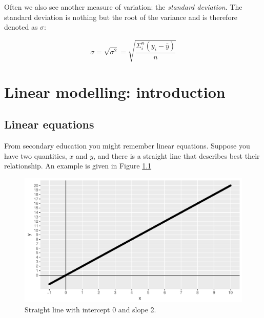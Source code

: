 \documentclass[]{report}\usepackage[]{graphicx}\usepackage[]{color}
\makeatletter
\def\maxwidth{ %
  \ifdim\Gin@nat@width>\linewidth
    \linewidth
  \else
    \Gin@nat@width
  \fi
}
\newenvironment{knitrout}{}{} %
\makeatother
\begin{document}
Often we also see another measure of variation: the \textit{standard deviation}. The standard deviation is nothing but the root of the variance and is therefore denoted as $\sigma$:

\begin{equation}
\sigma = \sqrt{\sigma^2}=\sqrt{  \frac{\Sigma_i^n (y_i-\bar{y})}{n}}
\end{equation}



\chapter{Linear modelling: introduction}


\section{Linear equations}

From secondary education you might remember linear equations. Suppose you have two quantities, $x$ and $y$, and there is a straight line that describes best their relationship. An example is given in Figure \ref{fig:lm_1}

\begin{knitrout}
\color{fgcolor}\begin{figure}

{\centering \includegraphics[width=\maxwidth]{figure/lm_1-1} 

}

\caption[Straight line with intercept 0 and slope 2]{Straight line with intercept 0 and slope 2.}\label{fig:lm_1}
\end{figure}


\end{knitrout}
\end{document}
